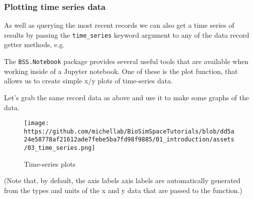 \hypertarget{plotting-time-series-data}{%
\subsubsection{Plotting time series
data}\label{plotting-time-series-data}}

As well as querying the most recent records we can also get a time
series of results by passing the \texttt{time\_series} keyword argument
to any of the data record getter methods, e.g.

\begin{Shaded}
\begin{Highlighting}[]
\OperatorTok{=}\OperatorTok{=}\NormalTok{)}
\end{Highlighting}
\end{Shaded}

The \texttt{BSS.Notebook} package provides several useful tools that are
available when working inside of a Jupyter notebook. One of these is the
plot function, that allows us to create simple x/y plots of time-series
data.

Let's grab the same record data as above and use it to make some graphs
of the data.

\begin{Shaded}
\begin{Highlighting}[]
\OperatorTok{=}\OperatorTok{=}\OperatorTok{=}\NormalTok{))}

\OperatorTok{=}\OperatorTok{=}\OperatorTok{=}\NormalTok{))}
\end{Highlighting}
\end{Shaded}

\begin{figure}
\centering
\texttt{[image: https://github.com/michellab/BioSimSpaceTutorials/blob/dd5a24e58778af21612ade7febe5ba7fd98f9885/01\_introduction/assets/03\_time\_series.png]}
\caption{Time-series plots}
\end{figure}

(Note that, by default, the axis labels axis labels are automatically
generated from the types and units of the x and y data that are passed
to the function.)

